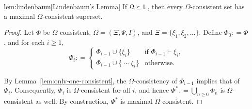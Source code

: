 \documentclass[a4paper,english,fleqn,11pt,final]{scrartcl}
\newcommand{\negg}{{\sim}}
\newcommand{\sfL}{\protect\ensuremath{\mathsf{L}}}
\providecommand{\dfn}{\mathrel{\mathop:}=}
\theoremstyle{plain}
\theoremstyle{definition}
\begin{document}
\begin{replemma}{lem:lindenbaum}[Lindenbaum's Lemma]
	If $\Omega \succeq \sfL$, then every $\Omega$-consistent set has a maximal $\Omega$-consistent superset.
\end{replemma}
\begin{proof}
Let $\Phi$ be $\Omega$-consistent, $\Omega = (\Xi,\Psi,I)$, and $\Xi = \{ \xi_1, \xi_2, \ldots\}$.
Define $\Phi_0 \dfn \Phi$, and for each $i \geq 1$,
\[
\Phi_{i} \dfn \begin{cases}\Phi_{i-1} \cup \{ \xi_i \} & \text{if }\Phi_{i-1} \vdash  \xi_i \text{,}\\
\Phi_{i-1} \cup \{ \negg \xi_i \} & \text{otherwise.}\end{cases}
\]

By Lemma~\ref{lem:only-one-consistent}, the $\Omega$-consistency of $\Phi_{i-1}$ implies that of $\Phi_{i}$.
Consequently, $\Phi_i$ is $\Omega$-consistent for all $i$, and hence $\Phi^* \dfn \bigcup_{n \geq 0}\Phi_n$ is $\Omega$-consistent as well.
By construction, $\Phi^*$ is maximal $\Omega$-consistent.
\end{proof}
\end{document}
